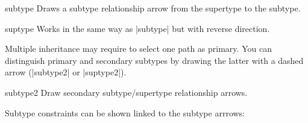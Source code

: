 \documentclass[a4paper,10pt]{article}
\begin{document}
\begin{stylekey}{subtype}
Draws a subtype relationship arrow from the supertype to the subtype.
\begin{figure}[h]
\centering
\begin{codeexample}[]
\end{codeexample}
\end{figure}
\end{stylekey}

\begin{stylekey}{suptype}
Works in the same way as |subtype| but with reverse direction.
\begin{codeexample}[]
\end{codeexample}
\end{stylekey}

\noindent Multiple inheritance may require to select one path as primary.
You can distinguish primary and secondary subtypes by drawing the latter
with a dashed arrow (|subtype2| or |suptype2|).

\begin{stylekey}{subtype2}
Draw secondary subtype/supertype relationship arrows.
\begin{codeexample}[]
\end{codeexample}
\end{stylekey}


\noindent
Subtype constraints can be shown linked to the subtype arrrows:

\begin{figure}[h]
\centering
\begin{codeexample}[]
\end{codeexample}
\end{figure}
\end{document}
